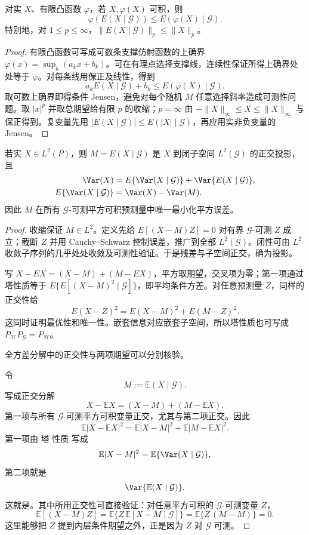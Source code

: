 \begin{proposition}[条件 Jensen 与 $L^p$ 收缩]
对实 $X$、有限凸函数 $\varphi$，若 $X,\varphi(X)$ 可积，则
\[
 \varphi(E(X\mid\mathcal G))\le E(\varphi(X)\mid\mathcal G).
\]
特别地，对 $1\le p\le\infty$，$\|E(X\mid\mathcal G)\|_p\le\|X\|_p$。
\end{proposition}
\begin{proof}
有限凸函数可写成可数条支撑仿射函数的上确界 $\varphi(x)=\sup_k(a_kx+b_k)$。可在有理点选择支撑线，连续性保证所得上确界处处等于 $\varphi$。对每条线用保正及线性，得到
\[
 a_kE(X\mid\mathcal G)+b_k\le E(\varphi(X)\mid\mathcal G).
\]
取可数上确界即得条件 Jensen，避免对每个随机 $M$ 任意选择斜率造成可测性问题。取 $|x|^p$ 并取总期望给有限 $p$ 的收缩；$p=\infty$ 由 $-\|X\|_\infty\le X\le\|X\|_\infty$ 与保正得到。复变量先用 $|E(X\mid\mathcal G)|\le E(|X|\mid\mathcal G)$，再应用实非负变量的 Jensen。
\end{proof}

\begin{theorem}[$L^2$ 投影与全方差]
若实 $X\in L^2(P)$，则 $M=E(X\mid\mathcal G)$ 是 $X$ 到闭子空间 $L^2(\mathcal G)$ 的正交投影，且
\begin{align}
 \Var(X)&=E\{\Var(X\mid\mathcal G)\}+\Var\{E(X\mid\mathcal G)\},
 \label{eq:math-stat-total-variance}\\
 E\{\Var(X\mid\mathcal G)\}&=\Var(X)-\Var(M).
 \label{eq:math-total-variance}
\end{align}
因此 $M$ 在所有 $\mathcal G$-可测平方可积预测量中唯一最小化平方误差。
\end{theorem}
\begin{proof}
收缩保证 $M\in L^2$。定义先给 $E[(X-M)Z]=0$ 对有界 $\mathcal G$-可测 $Z$ 成立；截断 $Z$ 并用 Cauchy--Schwarz 控制误差，推广到全部 $L^2(\mathcal G)$。闭性可由 $L^2$ 收敛子序列的几乎处处收敛及可测性验证。于是残差与子空间正交，确为投影。

写 $X-EX=(X-M)+(M-EX)$，平方取期望，交叉项为零；第一项通过塔性质等于 $E\{E[(X-M)^2\mid\mathcal G]\}$，即平均条件方差。对任意预测量 $Z$，同样的正交性给
\[
 E(X-Z)^2=E(X-M)^2+E(M-Z)^2.
\]
这同时证明最优性和唯一性。嵌套信息对应嵌套子空间，所以塔性质也可写成 $P_{\mathcal H}P_{\mathcal G}=P_{\mathcal H}$。

全方差分解中的正交性与两项期望可以分别核验。

令
\[
M:=\mathbb E(X\mid\mathcal G).
\]
写成正交分解
\[
X-\mathbb E X
=(X-M)+(M-\mathbb E X).
\]
第一项与所有 $\mathcal G$-可测平方可积变量正交，尤其与第二项正交。因此
\[
\mathbb E|X-\mathbb E X|^2
=
\mathbb E|X-M|^2+
\mathbb E|M-\mathbb E X|^2.
\]
第一项由 塔 性质 写成
\[
\mathbb E|X-M|^2
=\mathbb E\{\Var(X\mid\mathcal G)\},
\]
第二项就是
\[
\Var\{\mathbb E(X\mid\mathcal G)\}.
\]
这就是。其中所用正交性可直接验证：对任意平方可积的 $\mathcal G$-可测变量 $Z$，
\begin{equation*}
\mathbb E[(X-M)Z]
=\mathbb E\{Z\,\mathbb E[X-M\mid\mathcal G]\}
=\mathbb E\{Z\,(M-M)\}=0.
\end{equation*}
这里能够把 $Z$ 提到内层条件期望之外，正是因为 $Z$ 对 $\mathcal G$ 可测。
\end{proof}

